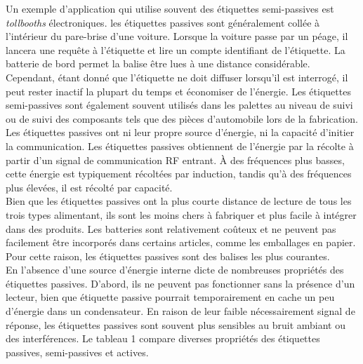 \documentclass[11pt, a4paper, twoside]{book}
\begin{document}
Un exemple d'application qui utilise souvent des étiquettes semi-passives est \emph {tollbooths} électroniques. les étiquettes passives sont généralement collée à l'intérieur du pare-brise d'une voiture. Lorsque la voiture passe par un péage, il lancera une requête à l'étiquette et lire un compte identifiant de l'étiquette. La batterie de bord permet la balise être lues à une distance considérable. Cependant, étant donné que l'étiquette ne doit diffuser lorsqu'il est interrogé, il peut rester inactif la plupart du temps et économiser de l'énergie. Les étiquettes semi-passives sont également souvent utilisés dans les palettes au niveau de suivi ou de suivi des composants tels que des pièces d'automobile lors de la fabrication.\\


Les étiquettes passives ont ni leur propre source d'énergie, ni la capacité d'initier la communication. Les étiquettes passives obtiennent de l'énergie par la récolte à partir d'un signal de communication RF entrant. À des fréquences plus basses, cette énergie est typiquement récoltées par induction, tandis qu'à des fréquences plus élevées, il est récolté par capacité.\\

Bien que les étiquettes passives ont la plus courte distance de lecture de tous les trois types alimentant, ils sont les moins chers à fabriquer et plus facile à intégrer dans des produits. Les batteries sont relativement coûteux et ne peuvent pas facilement être incorporés dans certains articles, comme les emballages en papier. Pour cette raison, les étiquettes passives sont des balises les plus courantes.\\

En l'absence d'une source d'énergie interne dicte de nombreuses propriétés des étiquettes passives. D'abord, ils ne peuvent pas fonctionner sans la présence d'un lecteur, bien que étiquette passive pourrait temporairement en cache un peu d'énergie dans un condensateur. En raison de leur faible nécessairement signal de réponse, les étiquettes passives sont souvent plus sensibles au bruit ambiant ou des interférences. Le tableau 1 compare diverses propriétés des étiquettes passives, semi-passives et actives.\\
\end{document}
